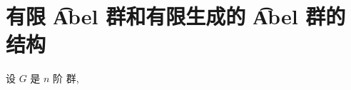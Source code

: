 \section{有限 \t{Abel} 群和有限生成的 \t {Abel} 群的结构}

\begin{theorem}\label{有限Abel群}
	设 $G$ 是 $n$ 阶 \Abel 群,
\end{theorem}